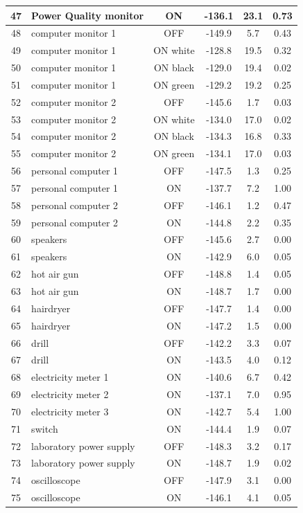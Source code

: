 \begin{longtable}{|c|p{}|c|c|c|c|}
47 & Power Quality monitor & ON & -136.1 & 23.1 & 0.73 \\ \hline
48 & computer monitor 1 & OFF & -149.9 & 5.7 & 0.43 \\ \hline
49 & computer monitor 1 & ON white & -128.8 & 19.5 & 0.32 \\ \hline
50 & computer monitor 1 & ON black & -129.0 & 19.4 & 0.02 \\ \hline
51 & computer monitor 1 & ON green & -129.2 & 19.2 & 0.25 \\ \hline
52 & computer monitor 2 & OFF & -145.6 & 1.7 & 0.03 \\ \hline
53 & computer monitor 2 & ON white & -134.0 & 17.0 & 0.02 \\ \hline
54 & computer monitor 2 & ON black & -134.3 & 16.8 & 0.33 \\ \hline
55 & computer monitor 2 & ON green & -134.1 & 17.0 & 0.03 \\ \hline
56 & personal computer 1 & OFF & -147.5 & 1.3 & 0.25 \\ \hline
57 & personal computer 1 & ON & -137.7 & 7.2 & 1.00 \\ \hline
58 & personal computer 2 & OFF & -146.1 & 1.2 & 0.47 \\ \hline
59 & personal computer 2 & ON & -144.8 & 2.2 & 0.35 \\ \hline
60 & speakers & OFF & -145.6 & 2.7 & 0.00 \\ \hline
61 & speakers & ON & -142.9 & 6.0 & 0.05 \\ \hline
62 & hot air gun & OFF & -148.8 & 1.4 & 0.05 \\ \hline
63 & hot air gun & ON & -148.7 & 1.7 & 0.00 \\ \hline
64 & hairdryer & OFF & -147.7 & 1.4 & 0.00 \\ \hline
65 & hairdryer & ON & -147.2 & 1.5 & 0.00 \\ \hline
66 & drill & OFF & -142.2 & 3.3 & 0.07 \\ \hline
67 & drill & ON & -143.5 & 4.0 & 0.12 \\ \hline
68 & electricity meter 1 & ON & -140.6 & 6.7 & 0.42 \\ \hline
69 & electricity meter 2 & ON & -137.1 & 7.0 & 0.95 \\ \hline
70 & electricity meter 3 & ON & -142.7 & 5.4 & 1.00 \\ \hline
71 & switch & ON & -144.4 & 1.9 & 0.07 \\ \hline
72 & laboratory power supply & OFF & -148.3 & 3.2 & 0.17 \\ \hline
73 & laboratory power supply & ON & -148.7 & 1.9 & 0.02 \\ \hline
74 & oscilloscope & OFF & -147.9 & 3.1 & 0.00 \\ \hline
75 & oscilloscope & ON & -146.1 & 4.1 & 0.05 \\ \hline
\end{longtable}
